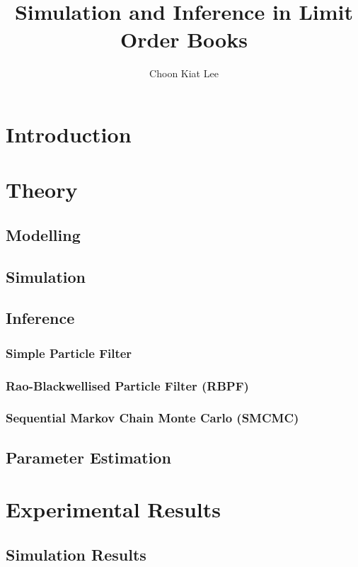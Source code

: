 \documentclass[12pt]{article}
\title{Simulation and Inference in Limit Order Books}
\author{Choon Kiat Lee}
\date{ }
\begin{document}
\noindent

\maketitle

\tableofcontents


\section{Introduction}
% 

\section{Theory}

\subsection{Modelling}
\subsection{Simulation}
\subsection{Inference}

\subsubsection{Simple Particle Filter}
\subsubsection{Rao-Blackwellised Particle Filter (RBPF)}
\subsubsection{Sequential Markov Chain Monte Carlo (SMCMC)}

\subsection{Parameter Estimation}

\section{Experimental Results}

\subsection{Simulation Results}
\end{document}
